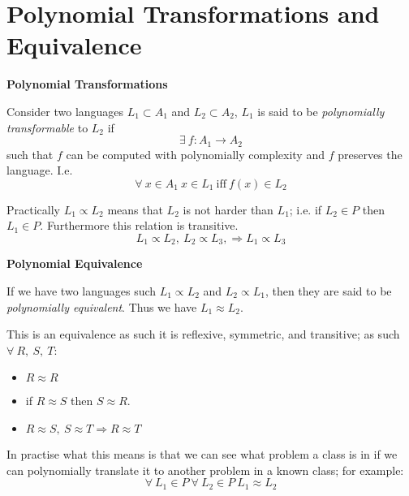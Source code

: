 \section{Polynomial Transformations and Equivalence}
\textbf{Polynomial Transformations}
\begin{definition}
    Consider two languages $L_1 \subset A_1$ and $L_2 \subset A_2$,
    $L_1$ is said to be \textit{polynomially transformable} to $L_2$ if
    $$\exists\ f : A_1 \rightarrow A_2$$
    such that $f$ can be computed with polynomially complexity and $f$ preserves the language. I.e.
    $$\forall\ x \in A_1\ x \in L_1\ \mathrm{iff}\ f(x)\in L_2$$
\end{definition}

Practically $L_1 \propto L_2$ means that
$L_2$ is not harder than $L_1$;
i.e. if $L_2 \in P$ then $L_1 \in P$.
Furthermore this relation is transitive.
$$
  L_1 \propto L_2,\ 
  L_2 \propto L_3,\Rightarrow
  L_1 \propto L_3
$$

\textbf{Polynomial Equivalence}
\begin{definition}
    If we have two languages such $L_1 \propto L_2$ and
    $L_2 \propto L_1$, then they are said to be \textit{polynomially equivalent}.
    Thus we have $L_1 \approx L_2$.
\end{definition}
This is an equivalence as such it is reflexive, symmetric, and transitive;
as such $\forall\ R,\ S,\ T$:
\begin{itemize}
    \item $R \approx R$
    \item if $R \approx S$ then $S \approx R$.
    \item $
        R \approx S,\ 
        S \approx T \Rightarrow
        R \approx T
        $
\end{itemize}

In practise what this means is that we can see what problem a class is in if we can
polynomially translate it to another problem in a known class; for example:
$$
  \forall\ L_1 \in P\ 
  \forall\ L_2 \in P\ 
  L_1 \approx L_2
$$

